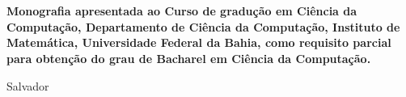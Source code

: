 

\begin{titlepage}
 \vfill
 \begin{center}
   {\large \uppercase{ \bf{ \meunome\ } } } \\[7cm]
   {\Huge \uppercase{ \bf{ \meutitulo\ } } }\\[1cm]
   \vfill
   \hspace{.45\textwidth} %
   \begin{minipage}{.5\textwidth}
     \begin{espacosimples}
       \bf{
	Monografia apresentada ao Curso de gradução em Ciência da Computação, 
	Departamento de Ciência da Computação, Instituto de Matemática, Universidade Federal da 
	Bahia, como requisito parcial para obtenção do grau de Bacharel em Ciência da Computação. \\ 
       }      
     \end{espacosimples}
     \begin{espacosimples}    
       \meuorientador
     \end{espacosimples}
   \end{minipage}
   \vfill
   Salvador \\
   \meuano
 \end{center}
\end{titlepage}
